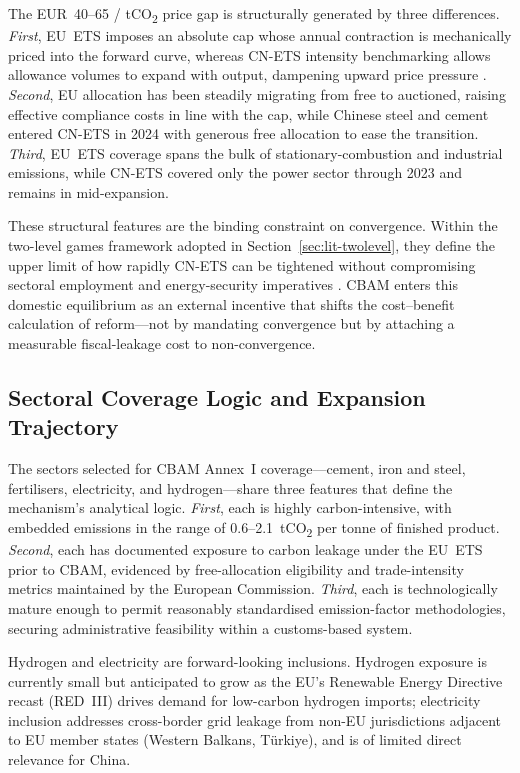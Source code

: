 \documentclass[letterpaper, 10pt, conference]{ieeeconf}
\begin{document}
The EUR~40--65 / tCO\textsubscript{2} price gap is structurally
generated by three differences. \textit{First}, EU~ETS imposes an
absolute cap whose annual contraction is mechanically priced into the
forward curve, whereas CN-ETS intensity benchmarking allows allowance
volumes to expand with output, dampening upward price pressure
\citep{Stoerk2019,Dai2025}. \textit{Second}, EU allocation has been
steadily migrating from free to auctioned, raising effective
compliance costs in line with the cap, while Chinese steel and cement
entered CN-ETS in 2024 with generous free allocation to ease the
transition. \textit{Third}, EU~ETS coverage spans the bulk of
stationary-combustion and industrial emissions, while CN-ETS covered
only the power sector through 2023 and remains in mid-expansion.

These structural features are the binding constraint on convergence.
Within the two-level games framework adopted in
Section~\ref{sec:lit-twolevel}, they define the upper limit of how
rapidly CN-ETS can be tightened without compromising sectoral
employment and energy-security imperatives \citep{Nahm2021}. CBAM
enters this domestic equilibrium as an external incentive that shifts
the cost--benefit calculation of reform---not by mandating convergence
but by attaching a measurable fiscal-leakage cost to non-convergence.

\subsection{Sectoral Coverage Logic and Expansion Trajectory}
\label{sec:coverage}

The sectors selected for CBAM Annex~I coverage---cement, iron and
steel, fertilisers, electricity, and hydrogen---share three
features that define the mechanism's analytical logic. \textit{First},
each is highly carbon-intensive, with embedded emissions in the range
of 0.6--2.1~tCO\textsubscript{2} per tonne of finished product.
\textit{Second}, each has documented exposure to carbon leakage under
the EU~ETS prior to CBAM, evidenced by free-allocation eligibility and
trade-intensity metrics maintained by the European Commission.
\textit{Third}, each is technologically mature enough to permit
reasonably standardised emission-factor methodologies, securing
administrative feasibility within a customs-based system.

Hydrogen and electricity are forward-looking inclusions. Hydrogen
exposure is currently small but anticipated to grow as the EU's
Renewable Energy Directive recast (RED~III) drives demand for
low-carbon hydrogen imports; electricity inclusion addresses
cross-border grid leakage from non-EU jurisdictions adjacent to EU
member states (Western Balkans, Türkiye), and is of limited direct
relevance for China.
\end{document}
